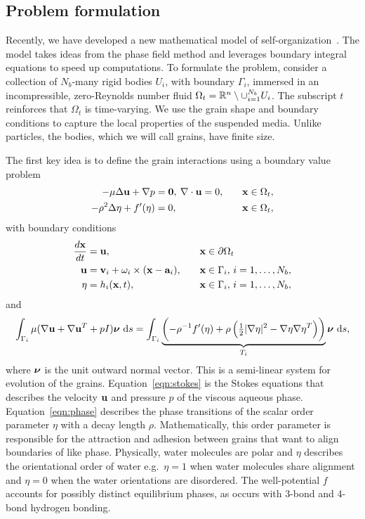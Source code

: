\subsection{Problem formulation}
Recently, we have developed a new mathematical model of
self-organization~\cite{FuQuRyYo22,ru-ryh-qua-you2022,Fu2018_SIAM}. The
model takes ideas from the phase field method and leverages boundary
integral equations to speed up computations. To formulate the problem,
consider a collection of $N_b$-many rigid bodies $U_i$, with boundary
$\Gamma_i$, immersed in an incompressible, zero-Reynolds number fluid
$\Omega_t = \mathbb{R}^n \setminus \cup_{i=1}^{N_b} U_i$. The subscript $t$
reinforces that $\Omega_t$ is time-varying. We use the grain shape and
boundary conditions to capture the local properties of the suspended
media. Unlike particles, the bodies, which we will call grains, have
finite size.  

The first key idea is to define the grain interactions using a boundary
value problem
\begin{alignat}{3}
  -\mu\Delta \mathbf{u} + \nabla p &= \mathbf{0}, \:
  \nabla \cdot \mathbf{u} = 0, \quad &&\mathbf{x} \in \Omega_t, \label {eqn:stokes} \\
  -\rho^2 \Delta \eta + f'(\eta) &= 0, &&\mathbf{x} \in \Omega_t,
  \label{eqn:phase}
\end{alignat}
with boundary conditions
\begin{alignat}{3}
  \frac{d\mathbf{x}}{dt} &= \mathbf{u}, &&\mathbf{x} \in \partial\Omega_t \label{eqn:noslip} \\
  \mathbf{u} &= \mathbf{v}_i + \omega_i \times (\mathbf{x} - \mathbf{a}_i), \quad &&\mathbf{x} \in
  \Gamma_i,\, i=1,\ldots,N_b, \label{eqn:rbm} \\
  \eta &= h_i(\mathbf{x},t),  &&\mathbf{x} \in \Gamma_i,\, i=1,\ldots,N_b,
  \label{eqn:material}
\end{alignat}
and
\begin{align}
\int_{\Gamma_i} \mu(\nabla \uu + \nabla \uu^T + pI)\nnu \,\dif s = 
\int_{\Gamma_i}
\underbrace{\left(-\rho^{-1} f'(\eta)
  + \rho\left(\tfrac{1}{2}|\nabla \eta|^2 - \nabla \eta \nabla
  \eta^T\right)\right)}_{T_i}
  \nnu \, \dif s,
  \label{eqn:stressbalance}
\end{align}
where $\boldsymbol{\nu}$ is the unit outward normal vector. This is a semi-linear
system for evolution of the grains.  Equation~\eqref{eqn:stokes} is the
Stokes equations that describes the velocity $\mathbf{u}$ and pressure $p$ of
the viscous aqueous phase.  Equation~\eqref{eqn:phase} describes the
phase transitions of the scalar order parameter $\eta$ with a decay
length $\rho$. Mathematically, this order parameter is responsible for
the attraction and adhesion between grains that want to align boundaries
of like phase. Physically, water molecules are polar and $\eta$
describes the orientational order of water e.g.~$\eta = 1$ when water
molecules share alignment and $\eta = 0$ when the water orientations are
disordered. The well-potential $f$ accounts for possibly distinct
equilibrium phases, as occurs with 3-bond and 4-bond hydrogen bonding.

